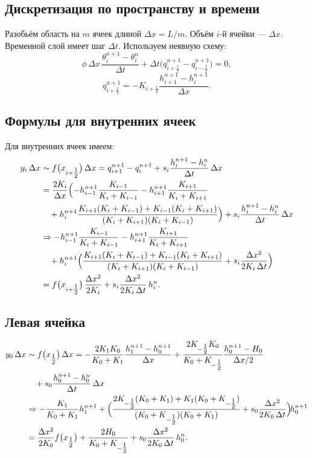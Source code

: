 \documentclass[a4paper,12pt]{article}
\begin{document}
\subsection{Дискретизация по пространству и времени}
Разобьём область на $m$ ячеек длиной $\Delta x = L/m$. Объём $i$-й ячейки — $\Delta x$. Временной слой имеет шаг $\Delta t$. Используем неявную схему:
\[
\phi\,\Delta x\,
\frac{\theta_i^{n+1}-\theta_i^n}{\Delta t}
+
\Delta t\bigl(q_{i+\frac12}^{n+1}-q_{i-\frac12}^{n+1}\bigr)
= 0,
\]
\[
q_{i+\frac12}^{n+1}
= -K_{i+\frac12}
\frac{h_{i+1}^{n+1}-h_i^{n+1}}{\Delta x}.
\]

\subsection{Формулы для внутренних ячеек}
Для внутренних ячеек имеем:
\begin{align}
y_i\,\Delta x 
&\sim f\bigl(x_{i+\tfrac12}\bigr)\,\Delta x
= q_{i+1}^{n+1}-q_i^{n+1}
+ s_i\frac{h_i^{n+1}-h_i^n}{\Delta t}\,\Delta x
\nonumber\\
&= \frac{2K_i}{\Delta x}
\Bigl(
- h_{i-1}^{n+1}\frac{K_{i-1}}{K_i+K_{i-1}}
- h_{i+1}^{n+1}\frac{K_{i+1}}{K_i+K_{i+1}}
\nonumber\\
&\quad
+ h_i^{n+1}\frac{K_{i+1}(K_i+K_{i-1}) + K_{i-1}(K_i+K_{i+1})}
{(K_i+K_{i+1})(K_i+K_{i-1})}
\Bigr)
+ s_i\frac{h_i^{n+1}-h_i^n}{\Delta t}\,\Delta x
\nonumber\\
&\Rightarrow 
- h_{i-1}^{n+1}\frac{K_{i-1}}{K_i+K_{i-1}}
- h_{i+1}^{n+1}\frac{K_{i+1}}{K_i+K_{i+1}}
\nonumber\\
&\quad
+ h_i^{n+1}\Bigl(\frac{K_{i+1}(K_i+K_{i-1}) + K_{i-1}(K_i+K_{i+1})}
{(K_i+K_{i+1})(K_i+K_{i-1})}
+ s_i\frac{\Delta x^2}{2K_i\,\Delta t}\Bigr)
\nonumber\\
&= f\bigl(x_{i+\tfrac12}\bigr)\,\frac{\Delta x^2}{2K_i}
+ s_i\frac{\Delta x^2}{2K_i\,\Delta t}\,h_i^n.
\end{align}

\subsection{Левая ячейка}
\begin{align}
y_0\,\Delta x
&\sim f\bigl(x_{\tfrac12}\bigr)\,\Delta x
= -\frac{2K_1K_0}{K_0+K_1}\frac{h_1^{n+1}-h_0^{n+1}}{\Delta x}
+ \frac{2K_{-\tfrac12}K_0}{K_0+K_{-\tfrac12}}\frac{h_0^{n+1}-H_0}{\Delta x/2}
\nonumber\\
&\quad
+ s_0\frac{h_0^{n+1}-h_0^n}{\Delta t}\,\Delta x
\nonumber\\
&\Rightarrow
- \frac{K_1}{K_0+K_1}h_1^{n+1}
+ \Bigl(
\frac{2K_{-\tfrac12}(K_0+K_1)+K_1(K_0+K_{-\tfrac12})}
{(K_0+K_{-\tfrac12})(K_0+K_1)}
+ s_0\frac{\Delta x^2}{2K_0\,\Delta t}
\Bigr)\!h_0^{n+1}
\nonumber\\
&= \frac{\Delta x^2}{2K_0}f\bigl(x_{\tfrac12}\bigr)
+ \frac{2H_0}{K_0+K_{-\tfrac12}}
+ s_0\frac{\Delta x^2}{2K_0\,\Delta t}\,h_0^n.
\end{align}
\end{document}
